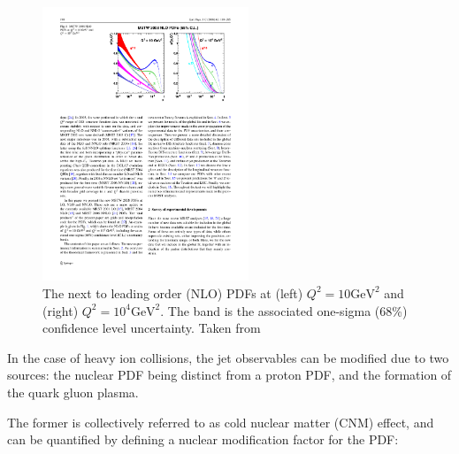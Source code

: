 \begin{figure}[htbp]
\begin{center}
\includegraphics[width=0.55\textwidth]{figures/theory/bjorkenX}
\caption{The next to leading order (NLO) PDFs at (left) $Q^2 = 10 \mathrm{GeV}^2$ and (right) $Q^2 = 10^4 \mathrm{GeV}^2$. The band is the associated one-sigma (68\%) confidence level uncertainty. Taken from \cite{Martin2009}}
\label{fig:bjorkenX}
\end{center}
\end{figure}






In the case of heavy ion collisions, the jet observables can be modified due to two sources: the nuclear PDF being distinct from a proton PDF, and the formation of the quark gluon plasma.

The former is collectively referred to as cold nuclear matter (CNM) effect, and can be quantified by defining a nuclear modification factor for the PDF:

